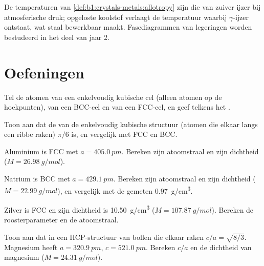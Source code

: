 \begin{remark}\label{rem:b1:crystals-metals:iron-T}
De temperaturen van \cref{def:b1:crystals-metals:allotropy} zijn die van
zuiver ijzer bij atmosferische druk; opgeloste koolstof verlaagt de
temperatuur waarbij $\gamma$-ijzer ontstaat, wat staal bewerkbaar maakt.
Fasediagrammen van legeringen worden bestudeerd in het deel van jaar 2.
\end{remark}

\section{Oefeningen}

\begin{exercise}[$\star$]\label{exo:b1:crystals-metals:1}
Tel de atomen van een enkelvoudig kubische cel (alleen atomen op de
hoekpunten), van een BCC-cel en van een FCC-cel, en geef telkens het
.
\end{exercise}

\begin{exercise}[$\star$]\label{exo:b1:crystals-metals:2}
Toon aan dat de  van de enkelvoudig kubische structuur (atomen
die elkaar langs een ribbe raken) $\pi/6$ is, en vergelijk met FCC en
BCC.
\end{exercise}

\begin{exercise}[$\star$]\label{exo:b1:crystals-metals:3}
Aluminium is FCC met $a = \qty{405.0}{pm}$. Bereken zijn atoomstraal en
zijn dichtheid ($M = \qty{26.98}{g/mol}$).
\end{exercise}


\begin{exercise}[$\star$]\label{exo:b1:crystals-metals:4}
Natrium is BCC met $a = \qty{429.1}{pm}$. Bereken zijn atoomstraal en
zijn dichtheid ($M = \qty{22.99}{g/mol}$), en vergelijk met de gemeten
\qty{0.97}{g/cm^3}.
\end{exercise}


\begin{exercise}[$\star\star$]\label{exo:b1:crystals-metals:5}
Zilver is FCC en zijn dichtheid is \qty{10.50}{g/cm^3}
($M = \qty{107.87}{g/mol}$). Bereken de roosterparameter en de
atoomstraal.
\end{exercise}


\begin{exercise}[$\star\star$]\label{exo:b1:crystals-metals:6}
Toon aan dat in een HCP-structuur van bollen die elkaar raken
$c/a = \sqrt{8/3}$. Magnesium heeft $a = \qty{320.9}{pm}$,
$c = \qty{521.0}{pm}$. Bereken $c/a$ en de dichtheid van magnesium
($M = \qty{24.31}{g/mol}$).
\end{exercise}


